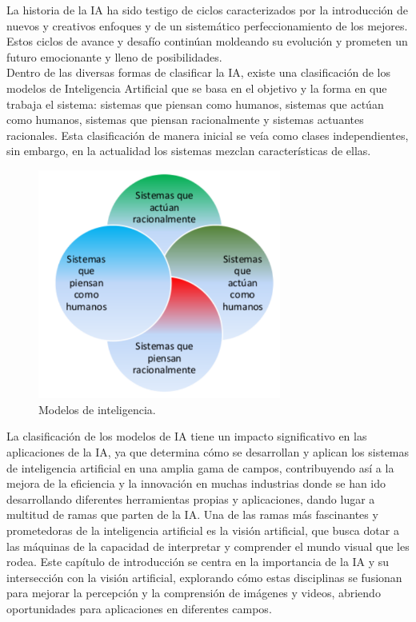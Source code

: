 La historia de la IA ha sido testigo de ciclos caracterizados por la introducción de nuevos y creativos enfoques y de un sistemático perfeccionamiento de los mejores. Estos ciclos de avance y desafío continúan moldeando su evolución y prometen un futuro emocionante y lleno de posibilidades.\\

Dentro de las diversas formas de clasificar la IA, existe una clasificación de los modelos de Inteligencia Artificial que se basa en el objetivo y la forma en que trabaja el sistema: sistemas que piensan como humanos, sistemas que actúan como humanos, sistemas que piensan racionalmente y sistemas actuantes racionales. Esta clasificación de manera inicial se veía como clases independientes, sin embargo, en la actualidad los sistemas mezclan características de ellas. \cite{Ponce14} \\

\begin{figure} [h!]
    \begin{center}
      \includegraphics[width=80mm]{figs/Modelos de inteligencia.png}
    \end{center}
    \caption{Modelos de inteligencia.}
    \label{fig:ModelosInteligencia}
\end{figure}

La clasificación de los modelos de IA tiene un impacto significativo en las aplicaciones de la IA, ya que determina cómo se desarrollan y aplican los sistemas de inteligencia artificial en una amplia gama de campos, contribuyendo así a la mejora de la eficiencia y la innovación en muchas industrias donde se han ido desarrollando diferentes herramientas propias y aplicaciones, dando lugar a multitud de ramas que parten de la IA. Una de las ramas más fascinantes y prometedoras de la inteligencia artificial es la visión artificial, que busca dotar a las máquinas de la capacidad de interpretar y comprender el mundo visual que les rodea. Este capítulo de introducción se centra en la importancia de la IA y su intersección con la visión artificial, explorando cómo estas disciplinas se fusionan para mejorar la percepción y la comprensión de imágenes y videos, abriendo oportunidades para aplicaciones en diferentes campos.

